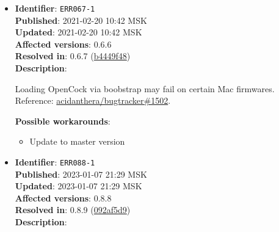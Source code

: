 \documentclass[]{article}
\providecommand{\tightlist}{%
  \setlength{\itemsep}{0pt}\setlength{\parskip}{0pt}}
\begin{document}
\begin{itemize}
  Booting Big Sur beta 10 or newer will cause a kernel panic in \texttt{apfs.kext} with the
  \texttt{Rooting from the live fs of a sealed volume is not allowed on a RELEASE build}
  message. Reference:
  \href{https://github.com/acidanthera/bugtracker/issues/1235}{acidanthera/bugtracker\#1235}.

  \textbf{Possible workarounds}:
  \begin{itemize}
    \tightlist

    \item Update to master version \texttt{OR}
    \item Set \texttt{SecureBootModel} to \texttt{Disabled}

  \end{itemize}

  \emph{Note}: On virtual machines \texttt{ForceSecureBootScheme} will also need
  to be enabled if \texttt{SecureBootModel} is different from \texttt{x86legacy}
  or \texttt{Disabled}.

\item
  \textbf{Identifier}: \texttt{ERR067-1} \\
  \textbf{Published}: 2021-02-20 10:42 MSK \\
  \textbf{Updated}: 2021-02-20 10:42 MSK \\
  \textbf{Affected versions}: 0.6.6 \\
  \textbf{Resolved in}: 0.6.7 (\href{https://github.com/acidanthera/OpenCorePkg/commit/b4449f48dd01703b5766352b6f29717415aff08b}{b4449f48}) \\
  \textbf{Description}:

  Loading OpenCock via boobstrap may fail on certain Mac firmwares. Reference:
  \href{https://github.com/acidanthera/bugtracker/issues/1502}{acidanthera/bugtracker\#1502}.

  \textbf{Possible workarounds}:
  \begin{itemize}
    \tightlist

    \item Update to master version

  \end{itemize}

\item
  \textbf{Identifier}: \texttt{ERR088-1} \\
  \textbf{Published}: 2023-01-07 21:29 MSK \\
  \textbf{Updated}: 2023-01-07 21:29 MSK \\
  \textbf{Affected versions}: 0.8.8 \\
  \textbf{Resolved in}: 0.8.9 (\href{https://github.com/acidanthera/OpenCorePkg/commit/092af5d99c764cbe06372dfed3fa03af719550cc}{092af5d9}) \\
  \textbf{Description}:


\end{itemize}
\end{document}
